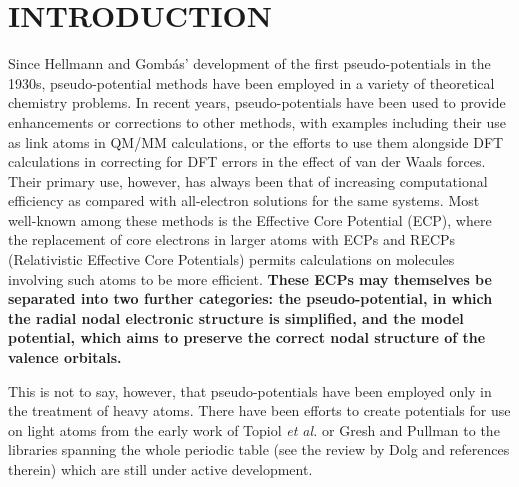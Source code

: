 \documentclass[12pt]{article}
\begin{document}


\renewcommand{\baselinestretch}{1.5}
\normalsize

\clearpage

\section*{\sffamily \Large INTRODUCTION}

Since Hellmann and Gomb\'as' development of the first pseudo-potentials in the 1930s,\cite{hellmann_1935, gombas_1935} pseudo-potential methods have been employed in a variety of theoretical chemistry problems. In recent years, pseudo-potentials have been used to provide enhancements or corrections to other methods, with examples including their use as link atoms in QM/MM calculations,%
\cite{%
singh_combined_1986,
assfeld_quantum_1996,
goedecker_separable_1996,
gao_generalized_1998,
hartwigsen_relativistic_1998,
zhang_pseudobond_1998,
dilabio_simple_2002,
von_lilienfeld_variational_2004,
von_lilienfeld_optimization_2004,
zhang_improved_2004,
von_lilienfeld_performance_2005,
dilabio_efficient_2005,
jacob_calculation_2006,
parks_pseudobond_2008,
lewin_modified_2008,
ihrig_specific_2011,
von_lilienfeld_force_2013,
hitzenberger_probing_2015,
collins_energy-based_2015,
pezeshki_recent_2015,
chung_oniom_2015,
hitzenberger_optimizing_2016} or the efforts to use them alongside DFT calculations in correcting for DFT errors in the effect of van der Waals forces.\cite{dilabio_2008} Their primary use, however, has always been that of increasing computational efficiency as compared with all-electron solutions for the same systems. Most well-known among these methods is the Effective Core Potential (ECP),\cite{dolg_2000} where the replacement of core electrons in larger atoms with ECPs and RECPs (Relativistic Effective Core Potentials) permits calculations on molecules involving such atoms to be more efficient. \textbf{These ECPs may themselves be separated into two further categories: the pseudo-potential, in which the radial nodal electronic structure is simplified, and the model potential, which aims to preserve the correct nodal structure of the valence orbitals.\cite{cao_2011}}

This is not to say, however, that pseudo-potentials have been employed only in the treatment of heavy atoms. There have been efforts to create potentials for use on light
atoms from the early work of Topiol \emph{et al.} or Gresh and Pullman \cite{topiol_1976, gresh_1978}
to the libraries spanning the whole periodic table (see the review by Dolg\cite{dolg_relativistic_2012} and references therein) which are still under active development.\cite{zou_open_2018}
\end{document}

